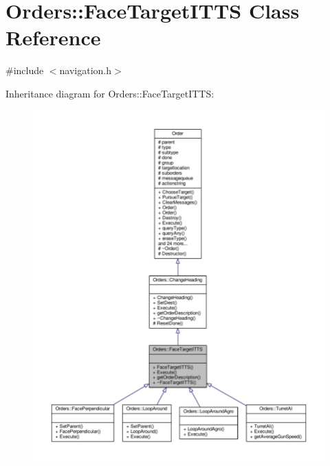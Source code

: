 \hypertarget{classOrders_1_1FaceTargetITTS}{}\section{Orders\+:\+:Face\+Target\+I\+T\+TS Class Reference}
\label{classOrders_1_1FaceTargetITTS}


{\ttfamily \#include $<$navigation.\+h$>$}



Inheritance diagram for Orders\+:\+:Face\+Target\+I\+T\+TS\+:
\nopagebreak
\begin{figure}[H]
\begin{center}
\leavevmode
\includegraphics[width=350pt]{d5/db3/classOrders_1_1FaceTargetITTS__inherit__graph}
\end{center}
\end{figure}


